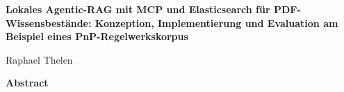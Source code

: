 \begin{titlepage}
\thispagestyle{empty}
\centering
\vspace*{2.5cm}
{\LARGE\bfseries Lokales Agentic-RAG mit MCP und Elasticsearch für PDF-Wissensbestände: Konzeption, Implementierung und Evaluation am Beispiel eines PnP-Regelwerkskorpus\par}
\vspace{1.5cm}
{\Large Raphael Thelen\par}
\vspace{2cm}
\begin{minipage}{0.88\textwidth}
\raggedright
\textbf{Abstract}\par
\end{minipage}
\vfill
\end{titlepage}

\tableofcontents
\clearpage
{}
